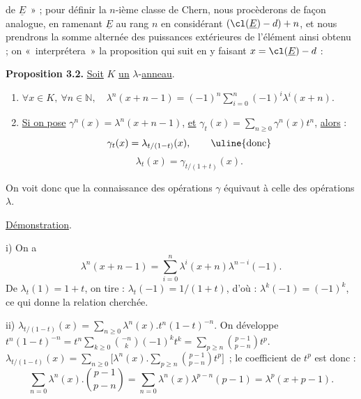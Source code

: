 
de \(\underline{E}\)~» ;
pour définir la \(n\)-ième classe de Chern, nous procèderons de façon analogue, en ramenant \(\underline{E}\) au rang \(n\) en considérant \((\cl(\underline{E})-d)+n\), et nous prendrons la somme alternée des puissances extérieures de l'élément ainsi obtenu ; on «~interprétera~» la proposition qui suit en y faisant \(x=\cl(\underline{E})-d\) :

\textbf{Proposition 3.2.} \uline{Soit} \(K\) \uline{un} \(\lambda\)-\uline{anneau}.
\begin{enumerate}[label=\roman*)]
\item \(\forall x\in K,\ \forall n\in\mathbb N,\quad \lambda^n(x+n-1)=(-1)^n\sum_{i=0}^n(-1)^i\lambda^i(x+n).\)
\item \uline{Si on pose} \(\gamma^n(x)=\lambda^n(x+n-1)\), \uline{et} \(\gamma_t(x)=\sum_{n\ge0}\gamma^n(x)t^n\), \uline{alors} :
\[
  \gamma_t(x)=\lambda_{t/(1-t)}(x),\qquad\text{\uline{donc}}
\]
\[
  \lambda_t(x)=\gamma_{t/(1+t)}(x).
\]
\end{enumerate}

On voit donc que la connaissance des opérations \(\gamma\) équivaut à celle des opérations \(\lambda\).

\uline{Démonstration}.

i) On a
\[
  \lambda^n(x+n-1)=\sum_{i=0}^{n}\lambda^i(x+n)\lambda^{n-i}(-1).
\]
De \(\lambda_t(1)=1+t\), on tire : \(\lambda_t(-1)=1/(1+t)\), d'où : \(\lambda^k(-1)=(-1)^k\), ce qui donne la relation cherchée.

ii) \(\lambda_{t/(1-t)}(x)=\sum_{n\ge0}\lambda^n(x).t^n(1-t)^{-n}.\)
On développe \(t^n(1-t)^{-n}=t^n\sum_{k\ge0}\binom{-n}{k}(-1)^kt^k=\sum_{p\ge n}\binom{p-1}{p-n}t^p\). \(\lambda_{t/(1-t)}(x)=\sum_{n\ge0}\bigl[\lambda^n(x).\sum_{p\ge n}\binom{p-1}{p-n}t^p\bigr]\)~; le coefficient de \(t^p\) est donc :
\[
  \sum_{n=0}\lambda^n(x).\binom{p-1}{p-n}
  =\sum_{n=0}\lambda^n(x)\lambda^{p-n}(p-1)
  =\lambda^p(x+p-1).
\]

